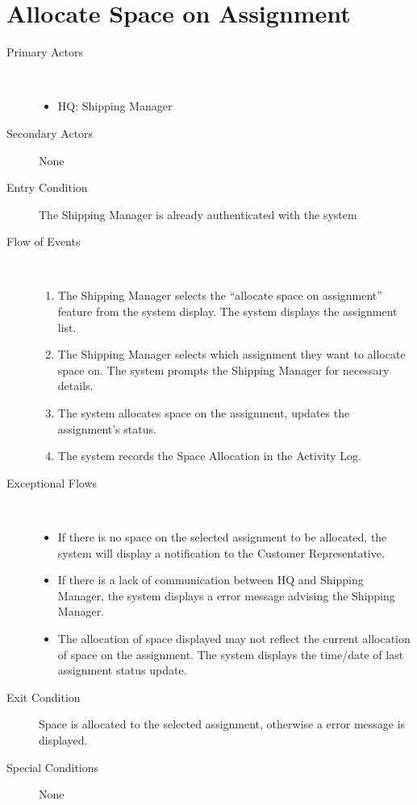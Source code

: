 \documentclass[a4paper,10pt]{report}
\begin{document}
\section{Allocate Space on Assignment}
\begin{description}
\item[Primary Actors] \
  \begin{itemize}
    \item HQ: Shipping Manager
  \end{itemize}
\item[Secondary Actors] None
\item[Entry Condition]
  The Shipping Manager is already authenticated with the system
\item[Flow of Events] \
  \begin{enumerate}
    \item The Shipping Manager selects the ``allocate space on assignment'' feature from the system display. The system displays the assignment list.
    \item The Shipping Manager selects which assignment they want to allocate space on. The system prompts the Shipping Manager for necessary details.
    \item The system allocates space on the assignment, updates the assignment's status.
    \item The system records the Space Allocation in the Activity Log.
  \end{enumerate}
\item[Exceptional Flows] \
  \begin{itemize}
    \item If there is no space on the selected assignment to be allocated, the system will display a notification to the Customer Representative.
    \item If there is a lack of communication between HQ and Shipping Manager, the system displays a error message advising the Shipping Manager.
    \item The allocation of space displayed may not reflect the current allocation of space on the assignment. The system displays the time/date of last assignment status update.
  \end{itemize}
\item[Exit Condition]
 Space is allocated to the selected assignment, otherwise a error message is displayed.
\item[Special Conditions] None
\end{description}
\end{document}
